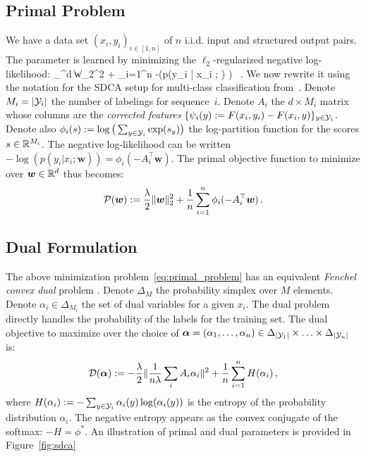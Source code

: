 \subsection{Primal Problem}
We have a data set $(x_i, y_i)_{i \in [1,n]}$ of $n$ i.i.d. input and structured output pairs.
The parameter is learned by minimizing the $\ell_2$-regularized negative log-likelihood:
\beq\label{negative log-likelihood}
\min_{\bw \in \real^d} \: \| \bm w\|_2^2 +  \sum_{i=1}^{n} -\log\left(p(y_i | x_i ; \bw) \right) \, .
\eeq
We now rewrite it using the notation for the SDCA setup for multi-class classification from~\citet{shalev2016accelerated}.
Denote $M_i = |{\mathcal Y}_i|$ the number of labelings for sequence~$i$.
Denote $A_i$ the $d \times M_i$ matrix whose columns are the \textit{corrected features} $\{\psi_i(y) := F(x_i, y_i) - F(x_i, y)\}_{y \in {\mathcal Y}_i}$.
Denote also $\phi_i(s) := \log \big(\sum_{y \in {\mathcal Y}_i} \exp(s_y)\big)$ the log-partition function for the scores $s \in \mathbb{R}^{M_i}$. The negative log-likelihood can be written $-\log(p(y_i|x_i ;\bm w)) = \phi_i(-A_i^{\top} \bm w)$. The primal objective function to minimize over $\bm w \in \mathbb{R}^d$ thus  becomes:
\begin{equation}
	\label{eq:primal_problem}
	{\mathcal P}(\bm w) := \frac{\lambda}{2}\| \bm w\|_2^2
	+ \frac{1}{n}   \sum_{i=1}^{n} \phi_i(-A_i^{\top} \bm w) \, .
\end{equation}

\subsection{Dual Formulation}
The above minimization problem~\eqref{eq:primal_problem} has an equivalent {\it Fenchel convex dual} problem \citep{lebanon2002boosting}.
Denote $\Delta_{M}$ the probability simplex over $M$ elements.
Denote $\alpha_i \in \Delta_{M_i}$ the set of dual variables for a given $x_i$.
The dual problem directly handles the probability of the labels for the training set.
The dual objective to maximize over the choice of $\boldsymbol{\alpha} = (\alpha_1, \ldots, \alpha_n) \in \Delta_{|{\mathcal Y}_1|} \times \ldots \times \Delta_{|{\mathcal Y}_n|} $ is:
\begin{equation}
	\label{dual problem}
	{\mathcal D}(\boldsymbol{\alpha}) := -\frac{\lambda}{2} \| \frac{1}{n \lambda} \sum_i A_i \alpha_i \|^2
	+ \frac{1}{n} \sum_{i=1}^n H(\alpha_i) \, ,
\end{equation}
where $H(\alpha_i) := - \sum_{y \in {\mathcal Y}_i} \alpha_i(y) \log(\alpha_i(y))$ is the entropy of the probability distribution $\alpha_i$. The negative entropy appears as the convex conjugate of the softmax: $-H = \phi^*$.
An illustration of primal and dual parameters is provided in Figure~\ref{fig:sdca}

